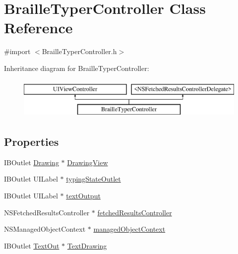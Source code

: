 \hypertarget{interface_braille_typer_controller}{\section{Braille\-Typer\-Controller Class Reference}
\label{interface_braille_typer_controller}
}


{\ttfamily \#import $<$Braille\-Typer\-Controller.\-h$>$}

Inheritance diagram for Braille\-Typer\-Controller\-:\begin{figure}[H]
\begin{center}
\leavevmode
\includegraphics[height=2.000000cm]{interface_braille_typer_controller}
\end{center}
\end{figure}
\subsection*{Properties}
\begin{DoxyCompactItemize}
\item 
I\-B\-Outlet \hyperlink{interface_drawing}{Drawing} $\ast$ \hyperlink{interface_braille_typer_controller_a88066d713e0f8835bf45282975e05699}{Drawing\-View}
\item 
I\-B\-Outlet U\-I\-Label $\ast$ \hyperlink{interface_braille_typer_controller_a90f80c61109927fdab32e8c7c1aee5aa}{typing\-State\-Outlet}
\item 
I\-B\-Outlet U\-I\-Label $\ast$ \hyperlink{interface_braille_typer_controller_a9e551ce7a3b41b818e3caf987c3fc7ed}{text\-Output}
\item 
N\-S\-Fetched\-Results\-Controller $\ast$ \hyperlink{interface_braille_typer_controller_a83e2b193cd86e86a287a26245429d4ac}{fetched\-Results\-Controller}
\item 
N\-S\-Managed\-Object\-Context $\ast$ \hyperlink{interface_braille_typer_controller_a41d112c271fb4f18c83e9cad1f542ec1}{managed\-Object\-Context}
\item 
I\-B\-Outlet \hyperlink{interface_text_out}{Text\-Out} $\ast$ \hyperlink{interface_braille_typer_controller_a69d1957238167401a2b7db7c9e403b1a}{Text\-Drawing}
\end{DoxyCompactItemize}


